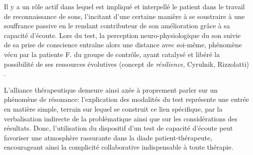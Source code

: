 \begin{itemize}
 Il y a  un rôle actif dans lequel est impliqué et interpellé le patient dans le travail
 de reconnaissance de sons, l'incitant d'une certaine manière  à se soustraire à une souffrance
 passive en  le rendant  contributeur de son amélioration grâce à sa capacité
 d'écoute.
  Lors du test, la perception
 neuro-physiologique du son suivie de sa prise de conscience
 entraîne alors une distance avec
 soi-même, phénomène vécu  par 
 la  patiente F.  du groupe de contrôle, ayant catalysé et libéré
 la possibilité de ses ressources évolutives (concept de \textit{résilience}, Cyrulnik, Rizzolatti) 
 \autocite[27--63]{van_eersel_cerveau}.
 
 
 L'alliance thérapeutique demeure ainsi axée à proprement parler
 sur
 un phénomène de résonance:  l'explication des modalités du test représente une
 entrée en matière simple, terrain  sur lequel se construit ce lien spécifique,
 par la verbalisation indirecte de la problématique ainsi que sur
 les considérations des résultats.
 Donc, l'utilisation
 du dispositif d'un test de capacité d'écoute peut favoriser une atmosphère rassurante dans la diade
 patient-thérapeute, encourageant ainsi la complicité collaborative
 indispensable à toute
 thérapie.

\end{itemize}
